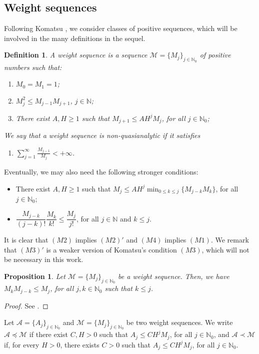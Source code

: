 \documentclass[11pt,reqno]{amsart}
\numberwithin{equation}{section}
\newtheorem{definition}[theorem]{Definition}
\newtheorem{proposition}[theorem]{Proposition}
\newcommand{\N}{{\mathbb{N}}} %
\newcommand{\Mj}{{\{M_j\}_{j\in\mathbb{N}_0}}} %
\newcommand{\Aj}{{\{A_j\}_{j\in\mathbb{N}_0}}} %
\newcommand{\M}{{\mathcal{M}}} %
\newcommand{\A}{{\mathcal{A}}} %
\begin{document}
\subsection{Weight sequences}
Following Komatsu \cite{Komatsu_ultra_1}, we consider classes of positive sequences, which will be involved
in the many definitions in the sequel.
%
\begin{definition}
	A weight sequence is a sequence $\M=\Mj$ of positive numbers such that:
	\begin{enumerate}
		\item[$(M0)$] $M_0=M_1=1$;
		\item[$(M1)$] $M_j^2\leq M_{j-1}M_{j+1}$, $j\in\N$;
		\item[$(M2)'$] There exist $A,H\geq 1$ such that $M_{j+1}\leq AH^j M_j$, for all $j\in\N_0$;
	\end{enumerate}
	We say that a weight sequence is non-quasianalytic if it satisfies
	\begin{enumerate}
		\item[$(M3)'$] $\displaystyle\sum_{j=1}^\infty\frac{M_{j-1}}{M_j}<+\infty$.
	\end{enumerate}
\end{definition}
%
Eventually, we may also need the following stronger conditions:
%
\begin{itemize}
	\item[$(M2)$] There exist $A,H\geq 1$ such that $\displaystyle M_j \leq AH^j\min_{0\leq k\leq j}\{M_{j-k}M_k\}$, for all $j\in\N_0$;
	
	\item[$(M4)$] $\dfrac{M_{j-k}}{(j-k)!} \dfrac{M_k}{k!} \leq \dfrac{M_j}{j!}$, for all $j\in\N$ and $k\leq j$.
\end{itemize}
%
It is clear that $(M2)$ implies $(M2)'$ and $(M4)$ implies $(M1)$. 
We remark that $(M3)'$ is a weaker version of Komatsu's condition $(M3)$, which will not be necessary in this work.
%
\begin{proposition}\label{MjMj-k}
	Let $\M=\Mj$ be a weight sequence. Then, we have $M_{k}M_{j-k}\leq M_{j}$, for all $j,k\in\N_0$ such that $k\leq j$.
\end{proposition}
%
\begin{proof}
	See \cite[Proposition 2.6]{LV2021}.
\end{proof}
%
Let $\A=\Aj$ and $\M=\Mj$ be two weight sequences. We write $\A\preceq \M$ if there exist $C,H>0$ such that $A_j\leq CH^jM_j$, for all $j\in\N_0$, and $\A\prec \M$ if, for every $H>0$, there exists $C>0$ such that $A_j\leq CH^jM_j$, for all $j\in\N_0$.
\end{document}
